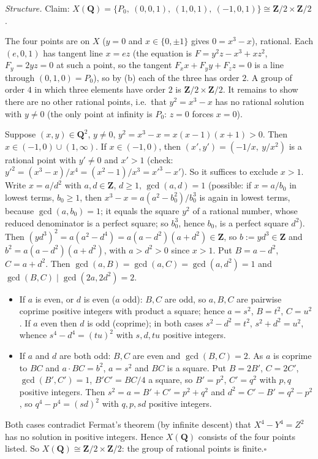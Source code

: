 \documentclass[11pt]{article}
\begin{document}
\emph{Structure.} Claim: $X(\mathbf Q)=\{P_0,\ (0,0,1),\ (1,0,1),\ (-1,0,1)\}\cong\mathbf Z/2\times\mathbf Z/2$.

The four points are on $X$ ($y=0$ and $x\in\{0,\pm1\}$ gives $0=x^3-x$), rational. Each $(e,0,1)$ has tangent line $x=ez$ (the equation is $F=y^2z-x^3+xz^2$, $F_y=2yz=0$ at such a point, so the tangent $F_xx+F_yy+F_zz=0$ is a line through $(0,1,0)=P_0$), so by (b) each of the three has order $2$. A group of order $4$ in which three elements have order $2$ is $\mathbf Z/2\times\mathbf Z/2$. It remains to show there are no other rational points, i.e.\ that $y^2=x^3-x$ has no rational solution with $y\ne0$ (the only point at infinity is $P_0$: $z=0$ forces $x=0$).

Suppose $(x,y)\in\mathbf Q^2$, $y\ne0$, $y^2=x^3-x=x(x-1)(x+1)>0$. Then $x\in(-1,0)\cup(1,\infty)$. If $x\in(-1,0)$, then $(x',y')=(-1/x,\ y/x^2)$ is a rational point with $y'\ne0$ and $x'>1$ (check: $y'^2=(x^3-x)/x^4=(x^2-1)/x^3=x'^3-x'$). So it suffices to exclude $x>1$. Write $x=a/d^2$ with $a,d\in\mathbf Z$, $d\ge1$, $\gcd(a,d)=1$ (possible: if $x=a/b_0$ in lowest terms, $b_0\ge1$, then $x^3-x=a(a^2-b_0^2)/b_0^3$ is again in lowest terms, because $\gcd(a,b_0)=1$; it equals the square $y^2$ of a rational number, whose reduced denominator is a perfect square; so $b_0^3$, hence $b_0$, is a perfect square $d^2$). Then $(yd^3)^2=a(a^2-d^4)=a(a-d^2)(a+d^2)\in\mathbf Z$, so $b:=yd^3\in\mathbf Z$ and $b^2=a(a-d^2)(a+d^2)$, with $a>d^2>0$ since $x>1$. Put $B=a-d^2$, $C=a+d^2$. Then $\gcd(a,B)=\gcd(a,C)=\gcd(a,d^2)=1$ and $\gcd(B,C)\mid\gcd(2a,2d^2)=2$.
\begin{itemize}
\item If $a$ is even, or $d$ is even ($a$ odd): $B,C$ are odd, so $a,B,C$ are pairwise coprime positive integers with product a square; hence $a=s^2$, $B=t^2$, $C=u^2$. If $a$ even then $d$ is odd (coprime); in both cases $s^2-d^2=t^2$, $s^2+d^2=u^2$, whence $s^4-d^4=(tu)^2$ with $s,d,tu$ positive integers.
\item If $a$ and $d$ are both odd: $B,C$ are even and $\gcd(B,C)=2$. As $a$ is coprime to $BC$ and $a\cdot BC=b^2$, $a=s^2$ and $BC$ is a square. Put $B=2B'$, $C=2C'$, $\gcd(B',C')=1$, $B'C'=BC/4$ a square, so $B'=p^2$, $C'=q^2$ with $p,q$ positive integers. Then $s^2=a=B'+C'=p^2+q^2$ and $d^2=C'-B'=q^2-p^2$, so $q^4-p^4=(sd)^2$ with $q,p,sd$ positive integers.
\end{itemize}
Both cases contradict Fermat's theorem (by infinite descent) that $X^4-Y^4=Z^2$ has no solution in positive integers. Hence $X(\mathbf Q)$ consists of the four points listed. So $X(\mathbf Q)\cong\mathbf Z/2\times\mathbf Z/2$: the group of rational points is finite.\hfill$\square$
\end{document}
